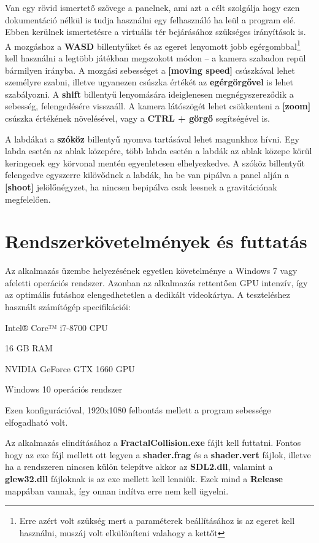 Van egy rövid ismertető szövege a panelnek, ami azt a célt szolgálja hogy ezen dokumentáció nélkül is tudja használni egy felhasználó ha leül a program elé. Ebben kerülnek ismertetésre a virtuális tér bejárásához szükséges irányítások is. A mozgáshoz a \textbf{WASD} billentyűket és az egeret lenyomott jobb egérgombbal\footnote{Erre azért volt szükség mert a paraméterek beállításához is az egeret kell használni, muszáj volt elkülöníteni valahogy a kettőt} kell használni a legtöbb játékban megszokott módon -- a kamera szabadon repül bármilyen irányba. A mozgási sebességet a \textbf{[moving speed]} csúszkával lehet személyre szabni, illetve ugyanezen csúszka értékét az \textbf{egérgörgővel} is lehet szabályozni. A \textbf{shift} billentyű lenyomására ideiglenesen megnégyszereződik a sebesség, felengedésére visszaáll. A kamera látószögét lehet csökkenteni a \textbf{[zoom]} csúszka értékének növelésével, vagy a \textbf{CTRL + görgő} segítségével is.

A labdákat a \textbf{szóköz} billentyű nyomva tartásával lehet magunkhoz hívni. Egy labda esetén az ablak közepére, több labda esetén a labdák az ablak közepe körül keringenek egy körvonal mentén egyenletesen elhelyezkedve. A szóköz billentyűt felengedve egyszerre kilövődnek a labdák, ha be van pipálva a panel alján a \textbf{[shoot]} jelölőnégyzet, ha nincsen bepipálva csak leesnek a gravitációnak megfelelően.
 
\cleardoublepage
\section{Rendszerkövetelmények és futtatás} 
\label{sec:futtatas} 
Az alkalmazás üzembe helyezésének egyetlen követelménye a Windows 7 vagy afeletti operációs rendszer. Azonban az alkalmazás rettentően GPU intenzív, így az optimális futáshoz elengedhetetlen a dedikált videokártya. A teszteléshez használt számítógép specifikációi:
\begin{compactitem}
	\item Intel® Core™ i7-8700 CPU
	\item 16 GB RAM
	\item NVIDIA GeForce GTX 1660 GPU
	\item Windows 10 operációs rendszer
\end{compactitem}
Ezen konfigurációval, 1920x1080 felbontás mellett a program sebessége elfogadható volt.

Az alkalmazás elindításához a \textbf{FractalCollision.exe} fájlt kell futtatni. Fontos hogy az exe fájl mellett ott legyen a \textbf{shader.frag} és a \textbf{shader.vert} fájlok, illetve ha a rendszeren nincsen külön telepítve akkor az \textbf{SDL2.dll}, valamint a \textbf{glew32.dll} fájloknak is az exe mellett kell lenniük. Ezek mind a \textbf{Release} mappában vannak, így onnan indítva erre nem kell ügyelni.

